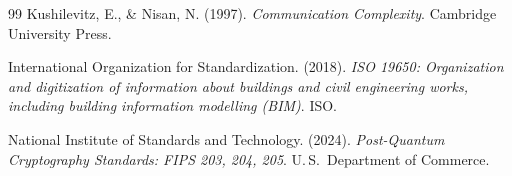 ﻿\documentclass[a4paper,12pt]{article}
\theoremstyle{definition}
\begin{document}
\begin{thebibliography}{99}
    Kushilevitz, E., \& Nisan, N. (1997).
    \textit{Communication Complexity}.
    Cambridge University Press.

    International Organization for Standardization. (2018).
    \textit{ISO 19650: Organization and digitization of information about buildings
    and civil engineering works, including building information modelling (BIM)}.
    ISO.

    National Institute of Standards and Technology. (2024).
    \textit{Post-Quantum Cryptography Standards: FIPS 203, 204, 205}.
    U.\,S.\ Department of Commerce.

\end{thebibliography}
\end{document}
